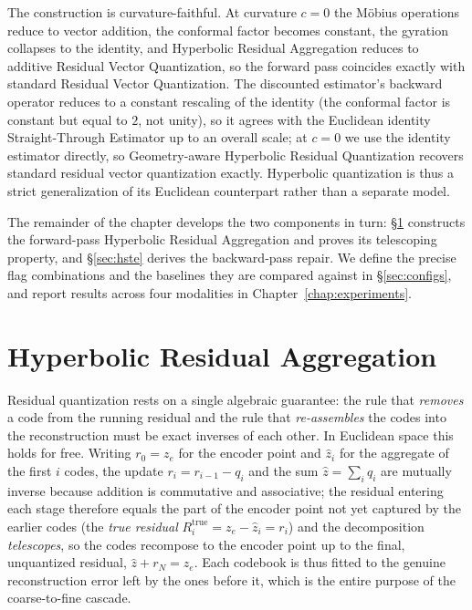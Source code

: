 \documentclass[12pt]{report}
\begin{document}
The construction is curvature-faithful. At curvature $c=0$ the M\"obius operations reduce to vector addition, the conformal factor becomes constant, the gyration collapses to the identity, and Hyperbolic Residual Aggregation reduces to additive Residual Vector Quantization, so the forward pass coincides exactly with standard Residual Vector Quantization. The discounted estimator's backward operator reduces to a constant rescaling of the identity (the conformal factor is constant but equal to $2$, not unity), so it agrees with the Euclidean identity Straight-Through Estimator up to an overall scale; at $c=0$ we use the identity estimator directly, so Geometry-aware Hyperbolic Residual Quantization recovers standard residual vector quantization exactly. Hyperbolic quantization is thus a strict generalization of its Euclidean counterpart rather than a separate model.

The remainder of the chapter develops the two components in turn: \S\ref{sec:residagg} constructs the forward-pass Hyperbolic Residual Aggregation and proves its telescoping property, and \S\ref{sec:hste} derives the backward-pass repair. We define the precise flag combinations and the baselines they are compared against in \S\ref{sec:configs}, and report results across four modalities in Chapter~\ref{chap:experiments}.

\section{Hyperbolic Residual Aggregation}
\label{sec:residagg}
\label{sec:newmethod}
Residual quantization rests on a single algebraic guarantee: the rule that \emph{removes} a code from the running residual and the rule that \emph{re-assembles} the codes into the reconstruction must be exact inverses of each other. In Euclidean space this holds for free. Writing $r_0=z_e$ for the encoder point and $\hat z_i$ for the aggregate of the first $i$ codes, the update $r_i=r_{i-1}-q_i$ and the sum $\hat z=\sum_i q_i$ are mutually inverse because addition is commutative and associative; the residual entering each stage therefore equals the part of the encoder point not yet captured by the earlier codes (the \emph{true residual} $R_i^{\text{true}}=z_e-\hat z_i=r_i$) and the decomposition \emph{telescopes}, so the codes recompose to the encoder point up to the final, unquantized residual, $\hat z+r_{N}=z_e$. Each codebook is thus fitted to the genuine reconstruction error left by the ones before it, which is the entire purpose of the coarse-to-fine cascade.
\end{document}
